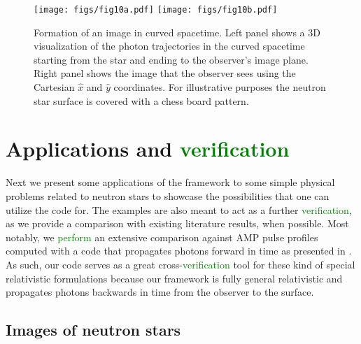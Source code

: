 \documentclass{aa}
\newcommand{\refe}[1]{\textcolor{green}{{#1}}}
\newcommand{\refedel}[1]{}
\newcommand{\lgamma}{\gamma_{\text{L}}}
\begin{document}
\begin{figure}
\centering
\texttt{[image: figs/fig10a.pdf]}
\texttt{[image: figs/fig10b.pdf]}
\caption{\label{fig:image}
  Formation of an image in curved spacetime.
  Left panel shows a 3D visualization of the photon trajectories in the curved spacetime starting from the star and ending to the observer's image plane.
  Right panel shows the image that the observer sees using the Cartesian $\hat{x}$ and $\hat{y}$ coordinates.
  For illustrative purposes the neutron star surface is covered with a chess board pattern.
  }
\end{figure}


\section{Applications and \refe{verification}}\label{sect:appl}

Next we present some applications of the framework to some simple physical problems related to neutron stars to showcase the possibilities that one can utilize the code for.
The examples are also meant to act as a further \refe{verification}, as we provide a comparison with existing literature results, when possible.
Most notably, we \refedel{employ}\refe{perform} an extensive comparison against AMP pulse profiles computed with a code that propagates photons forward in time as presented in \citet{PB06}.
As such, our code serves as a great cross-\refe{verification} tool for these kind of special relativistic formulations because our framework is fully general relativistic and propagates photons backwards in time from the observer to the surface.




\subsection{Images of neutron stars}
\end{document}
